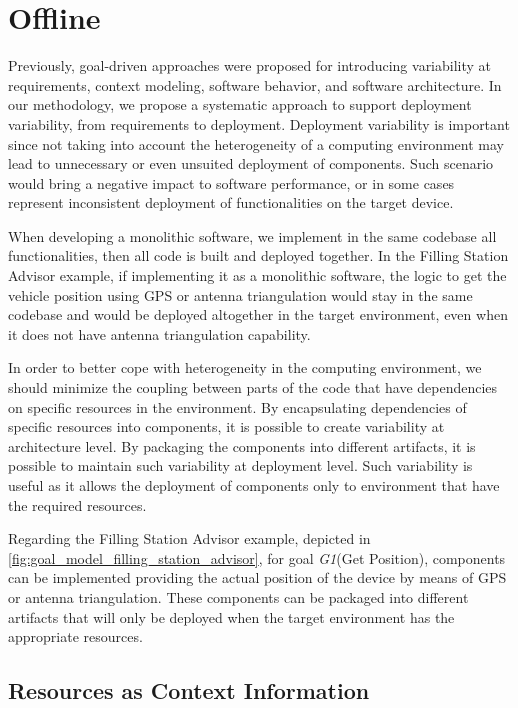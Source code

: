 \section{Offline}

Previously, goal-driven  approaches were proposed for introducing variability at requirements, context modeling, software behavior, and software architecture\cite{angelopoulos_capturing_2015}\cite{yu_goals_2008}.
In our methodology, we propose a systematic approach to support deployment variability, from requirements to deployment.
Deployment variability is important since not taking into account the heterogeneity of a computing environment may lead to unnecessary or even unsuited deployment of components.
Such scenario would bring a negative impact to software performance, or in some cases represent inconsistent deployment of functionalities on the target device.

When developing a monolithic software, we implement in the same codebase all functionalities, then all code is built and deployed together.
In the Filling Station Advisor example, if implementing it as a monolithic software, the logic to get the vehicle position using GPS or antenna triangulation would stay in the same codebase and would be deployed altogether in the target environment, even when it does not have antenna triangulation capability.


In order to better cope with heterogeneity in the computing environment, we should minimize the coupling between parts of the code that have dependencies on specific resources in the environment.
By encapsulating dependencies of specific resources into components, it is possible to create variability at architecture level. By packaging the components into different artifacts, it is possible to maintain such variability at deployment level. Such variability is useful as it allows the deployment of components only to environment that have the required resources.

Regarding the Filling Station Advisor example, depicted in \ref{fig:goal_model_filling_station_advisor}, for goal \emph{G1}(Get Position), components can be implemented providing the actual position of the device by means of GPS or antenna triangulation. These components can be packaged into different artifacts that will only be deployed when the target environment has the appropriate resources.

\subsection{Resources as Context Information}
\label{context}

